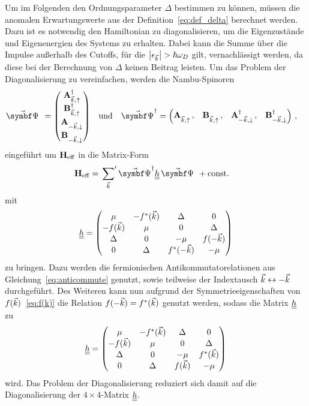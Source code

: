 Um im Folgenden den Ordnungsparameter $\Delta$ bestimmen zu können, müssen die anomalen Erwartungswerte aus der Definition~\eqref{eq:def_delta} berechnet werden.
Dazu ist es notwendig den Hamiltonian zu diagonalisieren, um die Eigenzustände und Eigenenergien des Systems zu erhalten.
Dabei kann die Summe über die Impulse außerhalb des Cutoffs, für die $\abs{\epsilon_{\vec{k}}} > \hbar \omega_D$ gilt, vernachlässigt werden, da diese bei der Berechnung von $\Delta$ keinen Beitrag leisten.
Um das Problem der Diagonalisierung zu vereinfachen, werden die Nambu-Spinoren
\begin{align}
    \vopsi &= \begin{pmatrix} \oadup \\  \obdup \\ \oadown \\ \obdown \end{pmatrix} & & \text{und} & & \vopsid = \begin{pmatrix} \oaup \, , & \obup\, , & \oaddown\, , & \obddown\end{pmatrix} \, ,
\end{align}
eingeführt um $\mathbf{H}_{\mathrm{eff}}$ in die Matrix-Form 
\begin{align}
    \oHeff &= \sump{\vk} \vopsid \dul{h} \, \vopsi + \text{const.}
\end{align}
mit 
\begin{align}
    \underline{\underline{h}} = \begin{pmatrix} \mu & -f^*({\vec{k}}) & \Delta & 0 \\ -f({\vec{k}}) & \mu & 0 & \Delta \\ \Delta & 0 & -\mu & f(-{\vec{k}}) \\ 0 & \Delta & f^*(-{\vec{k}}) & -\mu \end{pmatrix}
\end{align}
zu bringen.
Dazu werden die fermionischen Antikommutatorelationen aus Gleichung~\eqref{eq:anticommute} genutzt, sowie teilweise der Indextausch ${\vec{k}} \leftrightarrow -{\vec{k}}$ durchgeführt.
Des Weiteren kann nun aufgrund der Symmetrieeigenschaften von $f({\vec{k}})$~\eqref{eq:f(k)} die Relation $f(-{\vec{k}}) = f^*({\vec{k}})$ genutzt werden, sodass die Matrix $\underline{\underline{h}}$ zu
\begin{align}
    \underline{\underline{h}} = \begin{pmatrix} \mu & -f^*({\vec{k}}) & \Delta & 0 \\ -f({\vec{k}}) & \mu & 0 & \Delta \\ \Delta & 0 & -\mu & f^*({\vec{k}}) \\ 0 & \Delta & f({\vec{k}}) & -\mu \end{pmatrix}
\end{align}
wird.
Das Problem der Diagonalisierung reduziert sich damit auf die Diagonalisierung der $4 \times 4$-Matrix $\underline{\underline{h}}$. \\

